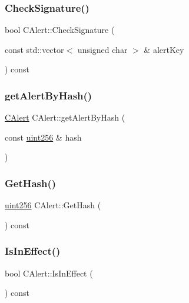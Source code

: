 \subsubsection{\texorpdfstring{Check\+Signature()}{CheckSignature()}}
{\footnotesize\ttfamily bool C\+Alert\+::\+Check\+Signature (\begin{DoxyParamCaption}\item[{const std\+::vector$<$ unsigned char $>$ \&}]{alert\+Key }\end{DoxyParamCaption}) const}

\mbox{\label{class_c_alert_aa37df9d177a6841ec5fa1e611c42b968}} 
\subsubsection{\texorpdfstring{get\+Alert\+By\+Hash()}{getAlertByHash()}}
{\footnotesize\ttfamily \mbox{\hyperlink{class_c_alert}{C\+Alert}} C\+Alert\+::get\+Alert\+By\+Hash (\begin{DoxyParamCaption}\item[{const \mbox{\hyperlink{classuint256}{uint256}} \&}]{hash }\end{DoxyParamCaption})\hspace{0.3cm}{\ttfamily [static]}}

\mbox{\label{class_c_alert_a059c136c9556e5e59a1a4dc39a97366d}} 
\subsubsection{\texorpdfstring{Get\+Hash()}{GetHash()}}
{\footnotesize\ttfamily \mbox{\hyperlink{classuint256}{uint256}} C\+Alert\+::\+Get\+Hash (\begin{DoxyParamCaption}{ }\end{DoxyParamCaption}) const}

\mbox{\label{class_c_alert_a018da40779a5c095c38bf10f4256cee6}} 
\subsubsection{\texorpdfstring{Is\+In\+Effect()}{IsInEffect()}}
{\footnotesize\ttfamily bool C\+Alert\+::\+Is\+In\+Effect (\begin{DoxyParamCaption}{ }\end{DoxyParamCaption}) const}

